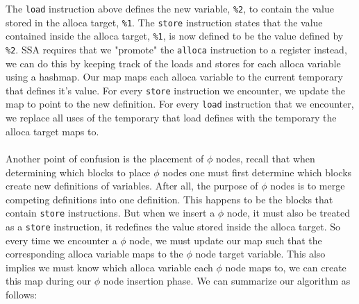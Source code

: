 \documentclass{article}
\begin{document}
The \verb|load| instruction above defines the new variable, \verb|%2|, to
contain the value stored in the alloca target, \verb|%1|. The \verb|store|
instruction states that the value contained inside the alloca target,
\verb|%1|, is now defined to be the value defined by \verb|%2|. SSA requires
that we "promote" the \verb|alloca| instruction to a register instead, we can
do this by keeping track of the loads and stores for each alloca variable using
a hashmap. Our map maps each alloca variable to the current temporary that
defines it's value. For every \verb|store| instruction we encounter, we update
the map to point to the new definition. For every \verb|load| instruction that
we encounter, we replace all uses of the temporary that load defines with the
temporary the alloca target maps to. \\~\\ Another point of confusion is the
placement of \(\phi\) nodes, recall that when determining which blocks to place
\(\phi\) nodes one must first determine which blocks create new definitions of
variables. After all, the purpose of \(\phi\) nodes is to merge competing
definitions into one definition. This happens to be the blocks that contain
\verb|store| instructions. But when we insert a \(\phi\) node, it must also be
treated as a \verb|store| instruction, it redefines the value stored inside the
alloca target. So every time we encounter a \(\phi\) node, we must update our
map such that the corresponding alloca variable maps to the \(\phi\) node
target variable. This also implies we must know which alloca variable each
\(\phi\) node maps to, we can create this map during our \(\phi\) node
insertion phase. We can summarize our algorithm as follows:
\end{document}
